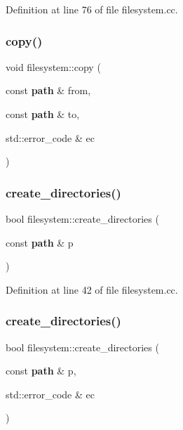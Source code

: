 Definition at line 76 of file filesystem.\+cc.

\mbox{\label{namespacefilesystem_a844ab86f9f90f11dd3a406d80e6294bd}} 
\subsubsection{copy()\hspace{0.1cm}{\footnotesize\ttfamily [2/2]}}
{\footnotesize\ttfamily void filesystem\+::copy (\begin{DoxyParamCaption}\item[{const \textbf{ path} \&}]{from,  }\item[{const \textbf{ path} \&}]{to,  }\item[{std\+::error\+\_\+code \&}]{ec }\end{DoxyParamCaption})}

\mbox{\label{namespacefilesystem_a02544035cdec4e720ec4431d5a5e7af8}} 
\subsubsection{create\_directories()\hspace{0.1cm}{\footnotesize\ttfamily [1/2]}}
{\footnotesize\ttfamily bool filesystem\+::create\+\_\+directories (\begin{DoxyParamCaption}\item[{const \textbf{ path} \&}]{p }\end{DoxyParamCaption})}



Definition at line 42 of file filesystem.\+cc.

\mbox{\label{namespacefilesystem_a3341d7eef82ce8e93ae0d75e7f6395c4}} 
\subsubsection{create\_directories()\hspace{0.1cm}{\footnotesize\ttfamily [2/2]}}
{\footnotesize\ttfamily bool filesystem\+::create\+\_\+directories (\begin{DoxyParamCaption}\item[{const \textbf{ path} \&}]{p,  }\item[{std\+::error\+\_\+code \&}]{ec }\end{DoxyParamCaption})}

